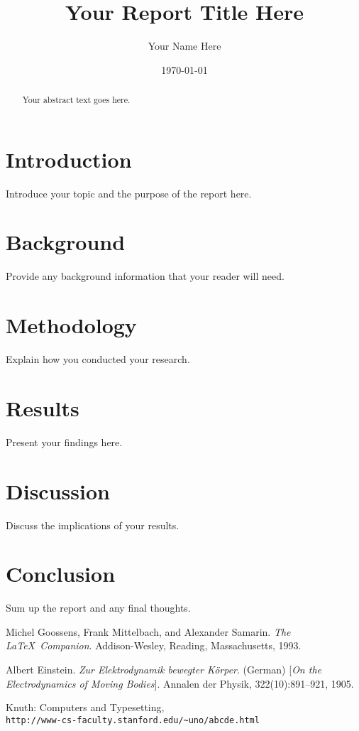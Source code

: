 \documentclass{article}
\title{Your Report Title Here}
\author{Your Name Here}
\date{\today}
\begin{document}
	
	\maketitle
	
	\begin{abstract}
		Your abstract text goes here.
	\end{abstract}
	
	\section{Introduction}
	Introduce your topic and the purpose of the report here.
	
	\section{Background}
	Provide any background information that your reader will need.
	
	\section{Methodology}
	Explain how you conducted your research.
	
	\section{Results}
	Present your findings here.
	
	\section{Discussion}
	Discuss the implications of your results.
	
	\section{Conclusion}
	Sum up the report and any final thoughts.
	
	\begin{thebibliography}{9}
		Michel Goossens, Frank Mittelbach, and Alexander Samarin. 
		\textit{The \LaTeX\ Companion}. 
		Addison-Wesley, Reading, Massachusetts, 1993.
		
		Albert Einstein. 
		\textit{Zur Elektrodynamik bewegter Körper}. (German) 
		[\textit{On the Electrodynamics of Moving Bodies}]. 
		Annalen der Physik, 322(10):891–921, 1905.
		
		Knuth: Computers and Typesetting,
		\\\texttt{http://www-cs-faculty.stanford.edu/\~{}uno/abcde.html}
	\end{thebibliography}
	
\end{document}
